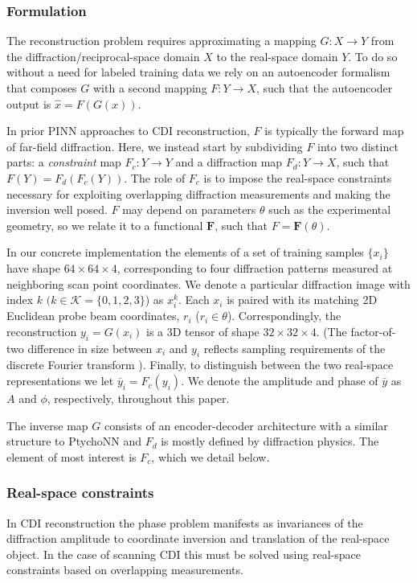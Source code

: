 \documentclass[sn-mathphys]{sn-jnl}%
\theoremstyle{thmstyleone}%
\theoremstyle{thmstyletwo}%
\theoremstyle{thmstylethree}%
\begin{document}
\subsubsection{Formulation}
The reconstruction problem requires approximating a mapping $G: X \rightarrow Y$ from the diffraction/reciprocal-space domain $X$ to the real-space domain $Y$. 
To do so without a need for labeled training data we rely on an autoencoder formalism that composes $G$ with a second mapping $F: Y \rightarrow X$, such that the autoencoder output is $\hat{x} = F(G(x))$. 

In prior PINN approaches to CDI reconstruction, $F$ is typically the forward map of far-field diffraction. Here, we instead start by subdividing $F$ into two distinct parts: a \emph{constraint} map $ F_c: Y \rightarrow Y$ and a diffraction map $ F_d: Y \rightarrow X$, such that $F(Y) = F_d(F_c(Y))$. The role of $F_c$ is to impose the real-space constraints necessary for exploiting overlapping diffraction measurements and making the inversion well posed. $F$ may depend on parameters $\theta$ such as the experimental geometry, so we relate it to a functional $\mathbf{F}$, such that $F = \mathbf{F}(\theta)$.

In our concrete implementation the elements of a set of training samples $\{x_i\}$ have shape $64 \times 64 \times 4$, corresponding to four diffraction patterns measured at neighboring scan point coordinates. We denote a particular diffraction image with index $k$ $(k \in \mathcal{K} = \{0, 1, 2, 3\}$) as $x_i^k$. Each $x_i$ is paired with its matching 2D Euclidean probe beam coordinates, $r_i$ ($r_i \in \theta$). Correspondingly, the reconstruction $y_i = G(x_i)$ is a 3D tensor of shape $32 \times 32 \times 4$. (The factor-of-two difference in size between $x_i$ and $y_i$ reflects sampling requirements of the discrete Fourier transform \cite{miao2000oversampling}). Finally, to distinguish between the two real-space representations we let $\bar{y}_i = F_c(y_i)$. We denote the amplitude and phase of $\bar{y}$ as $A$ and $\phi$, respectively, throughout this paper.

The inverse map $G$ consists of an encoder-decoder architecture with a similar structure to PtychoNN and $F_d$ is mostly defined by diffraction physics. The element of most interest is $F_c$, which we detail below.



\subsubsection{Real-space constraints}
In CDI reconstruction the phase problem manifests as invariances of the diffraction amplitude to coordinate inversion and translation of the real-space object. In the case of scanning CDI this must be solved using real-space constraints based on overlapping measurements.
\end{document}

